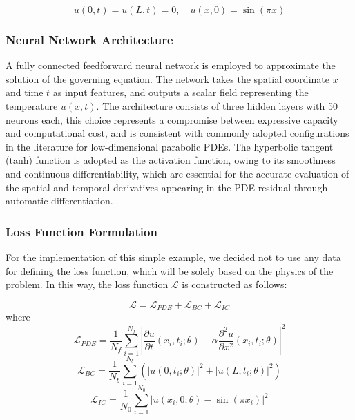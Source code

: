 \documentclass[final,1p,times]{elsarticle}
\theoremstyle{definition}
\begin{document}
\begin{equation}
u(0, t) = u(L, t) = 0, \quad u(x, 0) = \sin\left(\pi x\right)
\end{equation}

\subsubsection{Neural Network Architecture}

A fully connected feedforward neural network is employed to approximate the solution of the governing equation. The network takes the spatial coordinate \(x\) and time \(t\) as input features, and outputs a scalar field representing the temperature \(u(x, t)\). The architecture consists of three hidden layers with 50 neurons each, this choice represents a compromise between expressive capacity and computational cost, and is consistent with commonly adopted configurations in the literature for low-dimensional parabolic PDEs. The hyperbolic tangent (tanh) function is adopted as the activation function, owing to its smoothness and continuous differentiability, which are essential for the accurate evaluation of the spatial and temporal derivatives appearing in the PDE residual through automatic differentiation.

\subsubsection{Loss Function Formulation}

For the implementation of this simple example, we decided not to use any data for defining the loss function, which will be solely based on the physics of the problem. In this way, the loss function \( \mathcal{L} \) is constructed as follows:

\begin{equation}
\mathcal{L} = \mathcal{L}_{PDE} + \mathcal{L}_{BC} + \mathcal{L}_{IC}
\end{equation}
where
\begin{equation}
\mathcal{L}_{PDE} = \frac{1}{N_f} \sum_{i=1}^{N_f} \left| \frac{\partial u}{\partial t}(x_i, t_i;\theta) - \alpha \frac{\partial^2 u}{\partial x^2}(x_i, t_i;\theta) \right|^2
\end{equation}
\begin{equation}
\mathcal{L}_{BC} = \frac{1}{N_b} \sum_{i=1}^{N_b} \left( |u(0, t_i;\theta)|^2 + |u(L, t_i;\theta)|^2 \right)
\end{equation}
\begin{equation}
\mathcal{L}_{IC} = \frac{1}{N_0} \sum_{i=1}^{N_0} \left| u(x_i, 0;\theta) - \sin(\pi x_i) \right|^2
\end{equation}
\end{document}
